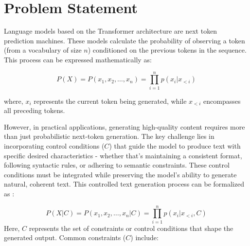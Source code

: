 \section{Problem Statement}

Language models based on the Transformer architecture are next token prediction machines.
These models calculate the probability of observing a token (from a vocabulary of size $n$) conditioned on the previous tokens in the sequence. This process can be expressed mathematically as:

\begin{equation}
P(X) = P(x_1, x_2, \ldots, x_n) = \prod_{i=1}^n p(x_i|x_{<i})
\end{equation}

where, $x_i$ represents the current token being generated, while $x_{<i}$ encompasses all preceding tokens.

However, in practical applications, generating high-quality content requires more than just probabilistic next-token generation. The key challenge lies in incorporating control conditions ($C$) that guide the model to produce text with specific desired characteristics - whether that's maintaining a consistent format, following syntactic rules, or adhering to semantic constraints. These control conditions must be integrated while preserving the model's ability to generate natural, coherent text. This controlled text generation process can be formalized as :

\begin{equation}
P(X|C) = P(x_1, x_2, \ldots, x_n|C) = \prod_{i=1}^n p(x_i|x_{<i}, C)
\end{equation}
Here, $C$ represents the set of constraints or control conditions that shape the generated output. Common constraints ($C$) include:

